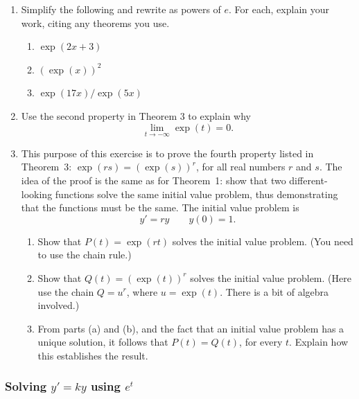 \begin{enumerate}
\item Simplify the following and rewrite as powers of $e$.  For each, explain your work, citing any theorems you use.

  \begin{enumerate}
  \item $\exp(2x+3)$


  \item $(\exp(x))^2$


  \item $\exp(17x)/\exp(5x)$



\end{enumerate}
\item Use the second property in Theorem 3  to explain why
	\[
\lim_{t \rightarrow - \infty} \exp(t) = 0.
\]


\item This purpose of this exercise is to prove the fourth property listed in Theorem~3: $\exp(rs) = (\exp(s))^r$, for all real numbers $r$ and $s$.  The idea of the proof is the same as for Theorem~1: show that two different-looking functions solve the same initial value problem, thus demonstrating that the functions must be the same.  The initial value problem is
	\[
y' = ry \qquad y(0) = 1.
\]


  \begin{enumerate}
  \item Show that $P(t) = \exp(rt)$ solves the initial value problem.  (You need to use the chain rule.)


  \item Show that $Q(t) = (\exp(t))^r$ solves the initial value problem.  (Here use the chain $Q = u^r$, where $u = \exp(t)$.  There is a bit of algebra involved.)


  \item From parts (a) and (b), and the fact that an initial value problem has a unique solution, it follows that $P(t) = Q(t)$, for every $t$.  Explain how this establishes the result.


\end{enumerate}
\end{enumerate}
\subsubsection{Solving $y'= ky$ using $e^t$}
\label{subsubsec:solving-y-ky-using-et}



